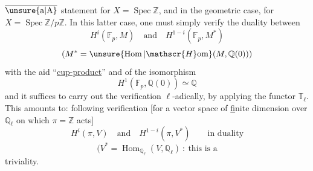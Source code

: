 $\overline{\text{\unsure{a|A}}}$ statement for $X=\operatorname{Spec}\mathbb{Z}$, and in the geometric case, for $X=\operatorname{Spec}\mathbb{Z}/p\mathbb{Z}$. In this latter case, one must simply verify the duality between
\[
H^i(\mathbb{F}_p,M)\quad\text{and}\quad H^{1-i}(\mathbb{F}_p,M^*)
\]
\[
(M^*=\unsure{\operatorname{Hom}|\mathscr{H}\mathrm{om}}(M,\mathbb{Q}(0)))
\]
with the aid  ``\uline{cup-product}'' and of the isomorphism
\[
H^1(\mathbb{F}_p,\mathbb{Q}(0))\simeq\mathbb{Q}
\]
and it suffices to carry out the verification $\ell$-adically, by applying the functor $\mathbb{T}_\ell$. This amounts to:  following verification [for a vector space of \uline{f}inite dimension over $\mathbb{Q}_\ell$ on which $\pi=\mathbb{Z}$ acts]
\[
H^i(\pi,V)\quad\text{and}\quad H^{1-i}(\pi,V^*)\qquad\text{in duality}
\]
\[
(V^*=\operatorname{Hom}_{\mathbb{Q}_\ell}(V,\mathbb{Q}_\ell)\ :\ \text{this is a}
\]
triviality.
